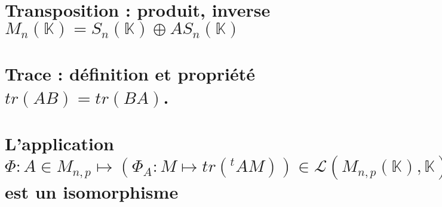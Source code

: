 \documentclass{article}
\begin{document}
	\section{Transposition : produit, inverse $M_n(\mathbb K)= S_n(\mathbb K) \oplus AS_n(\mathbb K)$}
	\section{Trace : définition et propriété $tr(AB)=tr(BA)$.}
	\section{L'application $\Phi : A \in M_{n,p} \longmapsto (\Phi_A : M \mapsto tr({}^tAM))\in \mathcal L(M_{n,p}(\mathbb K), \mathbb K)$ est un isomorphisme}
\end{document}
